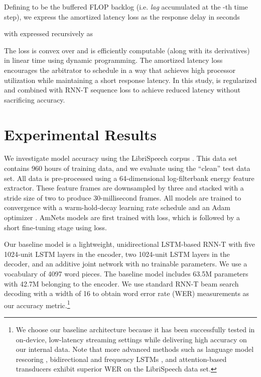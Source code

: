 \documentclass[a4paper]{article}
\begin{document}
Defining  to be the buffered FLOP backlog (i.e. \emph{lag} accumulated at the -th time step), we express the amortized latency loss  as the response delay in seconds

\noindent

\noindent
with  expressed recursively as
\noindent

\noindent
The loss is convex over  and is efficiently computable (along with its derivatives) in linear time using dynamic programming.
The amortized latency loss encourages the arbitrator to schedule in a way that achieves high processor utilization while maintaining a short response latency. In this study,  is regularized and combined with RNN-T sequence loss to achieve reduced latency without sacrificing accuracy.


\section{Experimental Results}
\label{sec:experiments}
We investigate model accuracy using the LibriSpeech corpus \cite{Panayotov2015}. This data set contains 960 hours of training data, and we evaluate using the ``clean'' test data set. All data is pre-processed using a 64-dimensional log-filterbank energy feature extractor. These feature frames are downsampled by three and stacked with a stride size of two to produce 30-millisecond frames. All models are trained to convergence with a warm-hold-decay learning rate schedule and an Adam optimizer \cite{Kingma2015}. AmNets models are first trained with  loss, which is followed by a short fine-tuning stage using  loss.

Our baseline model is a lightweight, unidirectional LSTM-based RNN-T with five 1024-unit LSTM layers in the encoder, two 1024-unit LSTM layers in the decoder, and an additive joint network with no trainable parameters. 
We use a vocabulary of 4097 word pieces. 
The baseline model includes 63.5M parameters with 42.7M belonging to the encoder. 
We use standard RNN-T beam search decoding with a width of 16 to obtain word error rate (WER) measurements as our accuracy metric.\footnote{We choose our baseline architecture because it has been successfully tested in on-device, low-latency streaming settings while delivering high accuracy on our internal data. Note that more advanced methods such as language model rescoring \cite{Li2020-a}, bidirectional and frequency LSTMs \cite{Graves2013-BiLSTM, Li2016}, and attention-based transducers \cite{Li2020-b, Zhao2020, Tian2019} exhibit superior WER on the LibriSpeech data set.}
\end{document}
